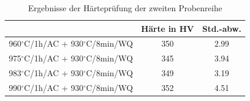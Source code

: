 \begin{table}[h]
	\centering
	\begin{tabular}{|c|c|c|}
		\hline 
		& Härte in HV &  Std.-abw. \\ 
		\hline 
		960$^\circ$C/1h/AC + 930$^\circ$C/8min/WQ & 350 & 2.99 \\ 
		\hline 
		975$^\circ$C/1h/AC + 930$^\circ$C/8min/WQ & 345 & 3.94 \\ 
		\hline 
		983$^\circ$C/1h/AC + 930$^\circ$C/8min/WQ & 349 & 3.19 \\ 
		\hline 
		990$^\circ$C/1h/AC + 930$^\circ$C/8min/WQ & 352 & 4.51 \\ 
		\hline 
    \end{tabular} 
	\caption{Ergebnisse der Härteprüfung der zweiten Probenreihe}
	\label{Tabelle 6}
\end{table}





